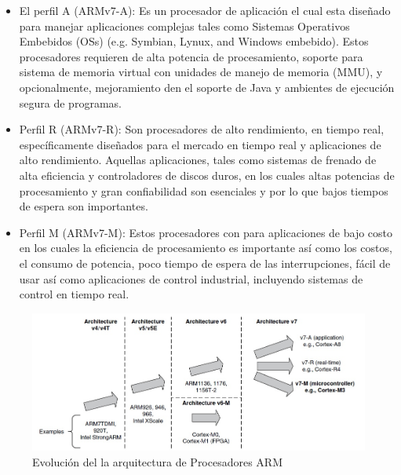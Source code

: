 \documentclass[12pt]{book}
\theoremstyle{definition}
\theoremstyle{remark}
\theoremstyle{plain}
\begin{document}
\begin{itemize}
\item El perfil A (ARMv7-A): Es un procesador de aplicación el cual esta diseñado para manejar aplicaciones complejas tales como Sistemas Operativos Embebidos (OSs) (e.g. Symbian, Lynux, and Windows embebido). Estos procesadores requieren de alta potencia de procesamiento, soporte para sistema de memoria virtual con unidades de manejo de memoria (MMU), y opcionalmente, mejoramiento den el soporte de Java y ambientes de ejecución segura de programas.

\item Perfil R (ARMv7-R): Son procesadores de alto rendimiento, en tiempo real, específicamente diseñados para el mercado en tiempo real y aplicaciones de alto rendimiento. Aquellas aplicaciones, tales como sistemas de frenado de alta eficiencia y controladores de  discos duros, en los cuales altas potencias de procesamiento y gran confiabilidad son esenciales y por lo que bajos tiempos de espera son importantes.
\item Perfil M (ARMv7-M): Estos procesadores con para aplicaciones de bajo costo en los cuales  la eficiencia de procesamiento es importante así como los costos, el consumo de potencia, poco tiempo de espera de las interrupciones, fácil de usar así como aplicaciones de control industrial, incluyendo sistemas de control en tiempo real.

\end{itemize}

\begin{figure}
\centering
\includegraphics[width=5in]{HistoriaARM.jpg}
\caption{Evolución del la arquitectura de Procesadores ARM}
\label{fig1}
\end{figure}
\end{document}
